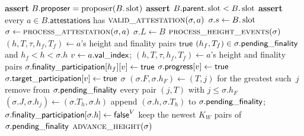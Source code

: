 \label{alg:chain-full}
\nopagebreak
{\footnotesize
\begin{algorithmic}[1]
  \State \textbf{assert} $B.\mathsf{proposer}=\operatorname{proposer}(B.\operatorname{slot})$
  \State \textbf{assert} $B.\mathsf{parent}.\operatorname{slot}<B.\operatorname{slot}$
  \State \textbf{assert} every $a\in B.\mathsf{attestations}$ has
    $\Call{valid\_attestation}{\sigma,a}$
  \State $\sigma.s\gets B.\operatorname{slot}$
    \State $\sigma\gets\Call{process\_attestation}{\sigma,a}$
  \EndFor
  \State $\sigma.L\gets B$
  \State \Return $\Call{process\_height\_events}{\sigma}$
\EndFunction
\vspace{1pt}
  \State $(h,T,\tau,h_f,T_f)\gets a$'s height and finality pairs
    \State \Return $\mathsf{true}$
  \EndIf
  \State \Return $(h_f,T_f)\in\sigma.\mathsf{pending\_finality}$ and
    $h_f<h<\sigma.h$
\EndFunction
\vspace{1pt}
  \State $v\gets a.\mathsf{val\_index}$;\quad
    $(h,T,\tau,h_f,T_f)\gets a$'s height and finality pairs
    \State $\sigma.\mathsf{finality\_participation}[h_f][v]\gets\mathsf{true}$
  \EndIf
    \State $\sigma.\mathsf{progress}[v]\gets\mathsf{true}$
      \State $\sigma.\mathsf{target\_participation}[v]\gets\mathsf{true}$
    \EndIf
  \EndIf
  \State \Return $\sigma$
\EndFunction
\vspace{1pt}
    \State $(\sigma.F,\sigma.h_F)\gets(T,j)$ for the greatest such~$j$
  \EndIf
  \State remove from $\sigma.\mathsf{pending\_finality}$ every pair $(j,T)$ with
    $j\leq\sigma.h_F$
    \State $(\sigma.J,\sigma.h_j)\gets(\sigma.T_h,\sigma.h)$
    \State append $(\sigma.h,\sigma.T_h)$ to $\sigma.\mathsf{pending\_finality}$;
      $\sigma.\mathsf{finality\_participation}[\sigma.h]\gets\mathsf{false}^{V}$
    \State keep the newest $K_W$ pairs of $\sigma.\mathsf{pending\_finality}$
    \State \Return $\Call{advance\_height}{\sigma}$
  \EndIf

\end{algorithmic}}
